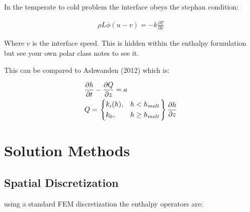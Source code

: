 \documentclass[a4paper,12pt]{article}
\newcommand{\pd}[2]{\frac{\partial #1}{\partial #2}}
\begin{document}
In the temperate to cold problem the interface obeys the stephan condition:

\begin{align*}
  \rho L \phi(u - v) = - k \pd{T}{x}
\end{align*}

Where $v$ is the interface speed. This is hidden within the enthalpy formulation but see your own polar class notes to see it.

\vspace{5mm}

This can be compared to Ashwanden (2012) which is:

\begin{align*}
  &\pd{h}{t} - \pd{Q}{z} = a\\
  &Q = \begin{rcases}
    \begin{dcases}
      k_i(h), &h < h_{melt}\\
      k_0, & h \geq h_{melt}
    \end{dcases}
    \end{rcases} \pd{h}{z}
\end{align*}



\section{Solution Methods}

\subsection{Spatial Discretization}

using a standard FEM discretization the enthalpy operators are:
\end{document}
